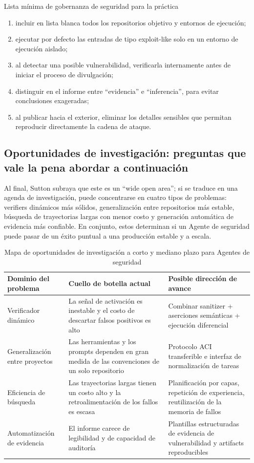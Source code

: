 \documentclass[a4paper]{article}
\begin{document}
\begin{importantbox}{Lista mínima de gobernanza de seguridad para la práctica}
\begin{enumerate}
    \item incluir en lista blanca todos los repositorios objetivo y entornos de ejecución;
    \item ejecutar por defecto las entradas de tipo exploit-like solo en un entorno de ejecución aislado;
    \item al detectar una posible vulnerabilidad, verificarla internamente antes de iniciar el proceso de divulgación;
    \item distinguir en el informe entre ``evidencia'' e ``inferencia'', para evitar conclusiones exageradas;
    \item al publicar hacia el exterior, eliminar los detalles sensibles que permitan reproducir directamente la cadena de ataque.
\end{enumerate}
\end{importantbox}

\subsection{Oportunidades de investigación: preguntas que vale la pena abordar a continuación}
Al final, Sutton subraya que este es un ``wide open area''; si se traduce en una agenda de investigación, puede concentrarse en cuatro tipos de problemas: verifiers dinámicos más sólidos, generalización entre repositorios más estable, búsqueda de trayectorias largas con menor costo y generación automática de evidencia más confiable. En conjunto, estos determinan si un Agente de seguridad puede pasar de un éxito puntual a una producción estable y a escala.

\begin{table}[H]
\centering
\begin{tabular}{p{3.0cm}p{4.4cm}p{4.8cm}}
\toprule
\textbf{Dominio del problema} & \textbf{Cuello de botella actual} & \textbf{Posible dirección de avance} \\
\midrule
Verificador dinámico & La señal de activación es inestable y el costo de descartar falsos positivos es alto & Combinar sanitizer + aserciones semánticas + ejecución diferencial \\
Generalización entre proyectos & Las herramientas y los prompts dependen en gran medida de las convenciones de un solo repositorio & Protocolo ACI transferible e interfaz de normalización de tareas \\
Eficiencia de búsqueda & Las trayectorias largas tienen un costo alto y la retroalimentación de los fallos es escasa & Planificación por capas, repetición de experiencia, reutilización de la memoria de fallos \\
Automatización de evidencia & El informe carece de legibilidad y de capacidad de auditoría & Plantillas estructuradas de evidencia de vulnerabilidad y artifacts reproducibles \\
\bottomrule
\end{tabular}
\caption{Mapa de oportunidades de investigación a corto y mediano plazo para Agentes de seguridad}
\end{table}
\end{document}
